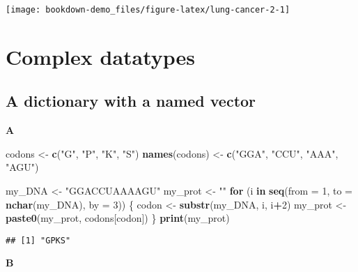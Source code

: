 \documentclass[]{book}
\newenvironment{Shaded}{\begin{snugshade}}{\end{snugshade}}
\newcommand{\ControlFlowTok}[1]{\textcolor[rgb]{0.13,0.29,0.53}{\textbf{#1}}}
\newcommand{\DataTypeTok}[1]{\textcolor[rgb]{0.13,0.29,0.53}{#1}}
\newcommand{\DecValTok}[1]{\textcolor[rgb]{0.00,0.00,0.81}{#1}}
\newcommand{\KeywordTok}[1]{\textcolor[rgb]{0.13,0.29,0.53}{\textbf{#1}}}
\newcommand{\NormalTok}[1]{#1}
\newcommand{\OperatorTok}[1]{\textcolor[rgb]{0.81,0.36,0.00}{\textbf{#1}}}
\newcommand{\StringTok}[1]{\textcolor[rgb]{0.31,0.60,0.02}{#1}}
\begin{document}
\begin{center}\texttt{[image: bookdown-demo\_files/figure-latex/lung-cancer-2-1]} \end{center}

\hypertarget{complex-datatypes-2}{%
\section{Complex datatypes}\label{complex-datatypes-2}}

\hypertarget{a-dictionary-with-a-named-vector-1}{%
\subsection{A dictionary with a named vector}\label{a-dictionary-with-a-named-vector-1}}

\textbf{A}

\begin{Shaded}
\begin{Highlighting}[]
\NormalTok{codons <-}\StringTok{ }\KeywordTok{c}\NormalTok{(}\StringTok{"G"}\NormalTok{, }\StringTok{"P"}\NormalTok{, }\StringTok{"K"}\NormalTok{, }\StringTok{"S"}\NormalTok{)}
\KeywordTok{names}\NormalTok{(codons) <-}\StringTok{ }\KeywordTok{c}\NormalTok{(}\StringTok{"GGA"}\NormalTok{, }\StringTok{"CCU"}\NormalTok{, }\StringTok{"AAA"}\NormalTok{, }\StringTok{"AGU"}\NormalTok{)}

\NormalTok{my_DNA <-}\StringTok{ "GGACCUAAAAGU"}
\NormalTok{my_prot <-}\StringTok{ ""}
\ControlFlowTok{for}\NormalTok{ (i }\ControlFlowTok{in} \KeywordTok{seq}\NormalTok{(}\DataTypeTok{from =} \DecValTok{1}\NormalTok{, }\DataTypeTok{to =} \KeywordTok{nchar}\NormalTok{(my_DNA), }\DataTypeTok{by =} \DecValTok{3}\NormalTok{)) \{}
\NormalTok{        codon <-}\StringTok{ }\KeywordTok{substr}\NormalTok{(my_DNA, i, i}\OperatorTok{+}\DecValTok{2}\NormalTok{)}
\NormalTok{        my_prot <-}\StringTok{ }\KeywordTok{paste0}\NormalTok{(my_prot, codons[codon])}
\NormalTok{\}}
\KeywordTok{print}\NormalTok{(my_prot)}
\end{Highlighting}
\end{Shaded}

\begin{verbatim}
## [1] "GPKS"
\end{verbatim}

\textbf{B}
\end{document}
